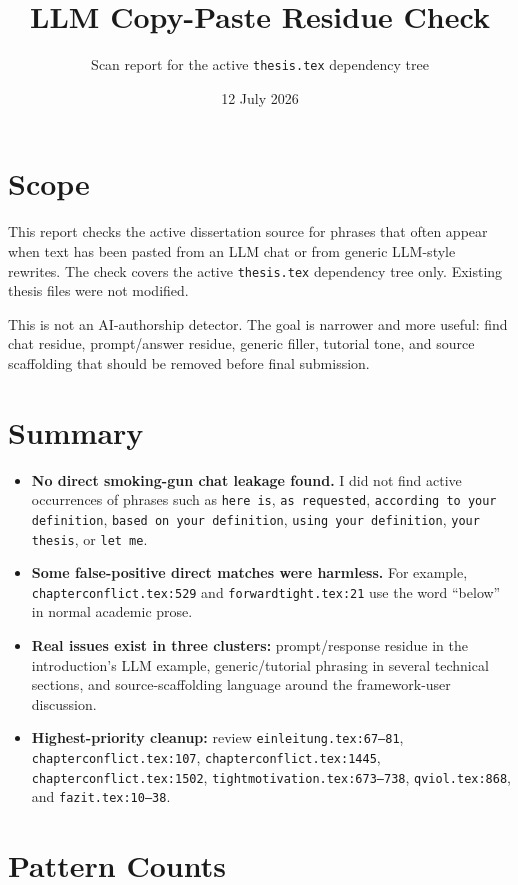 \documentclass[11pt,a4paper]{article}
\title{LLM Copy-Paste Residue Check}
\author{Scan report for the active \texttt{thesis.tex} dependency tree}
\date{12 July 2026}
\newcommand{\loc}[1]{\texttt{#1}}
\newcommand{\sev}[1]{\textbf{#1}}
\begin{document}
\maketitle

\section*{Scope}

This report checks the active dissertation source for phrases that often appear
when text has been pasted from an LLM chat or from generic LLM-style rewrites.
The check covers the active \loc{thesis.tex} dependency tree only. Existing
thesis files were not modified.

This is not an AI-authorship detector. The goal is narrower and more useful:
find chat residue, prompt/answer residue, generic filler, tutorial tone, and
source scaffolding that should be removed before final submission.

\section*{Summary}

\begin{itemize}
  \item \sev{No direct smoking-gun chat leakage found.} I did not find active
  occurrences of phrases such as \verb|here is|, \verb|as requested|,
  \verb|according to your definition|, \verb|based on your definition|,
  \verb|using your definition|, \verb|your thesis|, or \verb|let me|.
  \item \sev{Some false-positive direct matches were harmless.} For example,
  \loc{chapterconflict.tex:529} and \loc{forwardtight.tex:21} use the word
  ``below'' in normal academic prose.
  \item \sev{Real issues exist in three clusters:} prompt/response residue in the
  introduction's LLM example, generic/tutorial phrasing in several technical
  sections, and source-scaffolding language around the framework-user discussion.
  \item \sev{Highest-priority cleanup:} review \loc{einleitung.tex:67--81},
  \loc{chapterconflict.tex:107}, \loc{chapterconflict.tex:1445},
  \loc{chapterconflict.tex:1502}, \loc{tightmotivation.tex:673--738},
  \loc{qviol.tex:868}, and \loc{fazit.tex:10--38}.
\end{itemize}

\section*{Pattern Counts}
\end{document}
